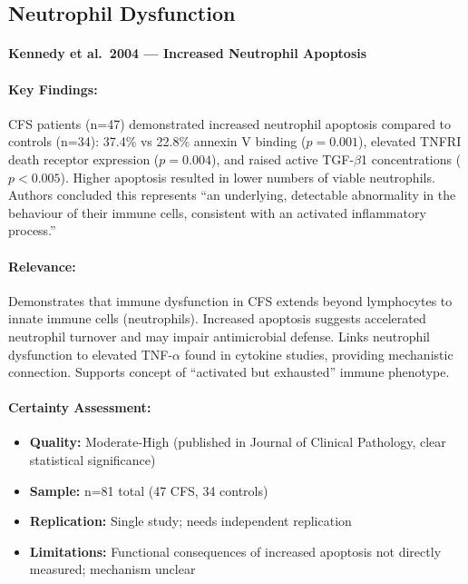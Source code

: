 \subsection{Neutrophil Dysfunction}

\paragraph{Kennedy et al.\ 2004 --- Increased Neutrophil Apoptosis}

\cite{Kennedy2004}

\paragraph{Key Findings:}
CFS patients (n=47) demonstrated increased neutrophil apoptosis compared to controls (n=34): 37.4\% vs 22.8\% annexin V binding ($p = 0.001$), elevated TNFRI death receptor expression ($p = 0.004$), and raised active TGF-$\beta$1 concentrations ($p < 0.005$). Higher apoptosis resulted in lower numbers of viable neutrophils. Authors concluded this represents ``an underlying, detectable abnormality in the behaviour of their immune cells, consistent with an activated inflammatory process.''

\paragraph{Relevance:}
Demonstrates that immune dysfunction in CFS extends beyond lymphocytes to innate immune cells (neutrophils). Increased apoptosis suggests accelerated neutrophil turnover and may impair antimicrobial defense. Links neutrophil dysfunction to elevated TNF-$\alpha$ found in cytokine studies, providing mechanistic connection. Supports concept of ``activated but exhausted'' immune phenotype.

\paragraph{Certainty Assessment:}
\begin{itemize}
    \item \textbf{Quality:} Moderate-High (published in Journal of Clinical Pathology, clear statistical significance)
    \item \textbf{Sample:} n=81 total (47 CFS, 34 controls)
    \item \textbf{Replication:} Single study; needs independent replication
    \item \textbf{Limitations:} Functional consequences of increased apoptosis not directly measured; mechanism unclear
\end{itemize}

